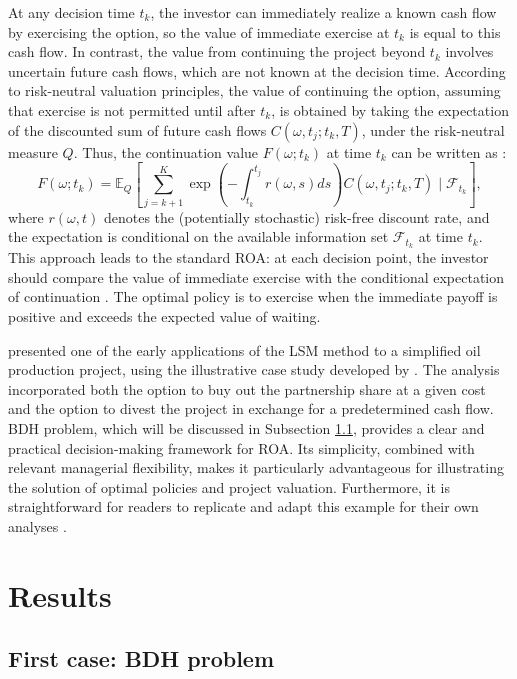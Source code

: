\documentclass[pdflatex,sn-basic]{sn-jnl}%
\theoremstyle{thmstyleone}%
\theoremstyle{thmstyletwo}%
\theoremstyle{thmstylethree}%
\begin{document}
At any decision time $t_k$, the investor can immediately realize a known cash flow by exercising the option, so the value of immediate exercise at $t_k$ is equal to this cash flow. In contrast, the value from continuing the project beyond $t_k$ involves uncertain future cash flows, which are not known at the decision time. According to risk-neutral valuation principles, the value of continuing the option, assuming that exercise is not permitted until after $t_k$, is obtained by taking the expectation of the discounted sum of future cash flows $C(\omega, t_j; t_k, T)$, under the risk-neutral measure $Q$. Thus, the continuation value $F(\omega; t_k)$ at time $t_k$ can be written as \citep{ref14}:
\begin{equation}
F(\omega; t_k) = \mathbb{E}_Q \left[ \sum_{j=k+1}^K \exp \left( -\int_{t_k}^{t_j} r(\omega, s) ds \right) C(\omega, t_j; t_k, T) \; \bigg| \; \mathcal{F}_{t_k} \right],
\end{equation}
where $r(\omega, t)$ denotes the (potentially stochastic) risk-free discount rate, and the expectation is conditional on the available information set $\mathcal{F}_{t_k}$ at time $t_k$. This approach leads to the standard ROA: at each decision point, the investor should compare the value of immediate exercise with the conditional expectation of continuation \citep{ref14}. The optimal policy is to exercise when the immediate payoff is positive and exceeds the expected value of waiting.


\cite{ref13} presented one of the early applications of the LSM method to a simplified oil production project, using the illustrative case study developed by \cite{ref12a, ref12b}. The analysis incorporated both the option to buy out the partnership share at a given cost and the option to divest the project in exchange for a predetermined cash flow. BDH problem, which will be discussed in Subsection \ref{subsec51}, provides a clear and practical decision-making framework for ROA. Its simplicity, combined with relevant managerial flexibility, makes it particularly advantageous for illustrating the solution of optimal policies and project valuation. Furthermore, it is straightforward for readers to replicate and adapt this example for their own analyses \citep{ref15}.

\section{Results}\label{sec5}

\subsection{First case: BDH problem}\label{subsec51}
\end{document}
